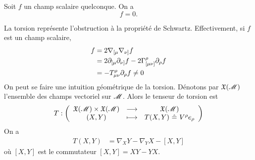 \documentclass[a4paper,11pt]{report}
\begin{document}
                \begin{prop}\begin{leftbar}
                    Soit $f$ un champ scalaire quelconque. On a
                    \begin{equation}
                        [\p_\mu,\p_\nu]f = 0.
                    \end{equation}
                \end{leftbar}\end{prop}
                
                La torsion représente l'obstruction à la propriété de Schwartz. Effectivement, si $f$ est un champ scalaire,
                \begin{align}
                    [\nabla_\mu,\nabla_\nu]f &= 2\nabla_{[\mu}\nabla_{\nu]}f\\
                    &= 2\p_{[\mu}\p_{\nu]}f-2\Gamma^\rho_{[\mu\nu]}\p_\rho f\\
                    &= -T^\rho_{\mu\nu}\p_\rho f\neq 0
                \end{align}
                On peut se faire une intuition géométrique de la torsion. Dénotons par $\mathfrak{X}(\mathscr{M})$ l'ensemble des champs vectoriel sur $\mathscr{M}$. Alors le tenseur de torsion est
                \begin{equation}
                T:\left(
                \begin{array}{ccc}
                    \mathfrak{X}(\mathscr{M})\times \mathfrak{X}(\mathscr{M}) & \longrightarrow & \mathfrak{X}(\mathscr{M})\\
                    (X,Y) & \longmapsto & T(X,Y)~\hat{=}~V^\rho e_\rho
                \end{array}
                \right)
                \end{equation}
                On a 
                \begin{align}
                    T(X,Y) &= \nabla_X Y - \nabla_Y X - [X,Y]
                \end{align}
                où $[X,Y]$ est le commutateur $[X,Y] = XY-YX$.\\
                
\end{document}
